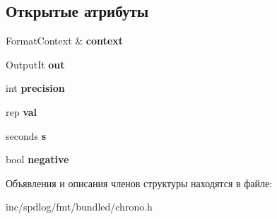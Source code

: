 \subsection*{Открытые атрибуты}
\begin{DoxyCompactItemize}
\item 
\mbox{\label{structinternal_1_1chrono__formatter_ad80a2fffd1e8491f2abdad94dab346cd}} 
Format\+Context \& {\bfseries context}
\item 
\mbox{\label{structinternal_1_1chrono__formatter_ac906e02120e826534b1266ede2e09198}} 
Output\+It {\bfseries out}
\item 
\mbox{\label{structinternal_1_1chrono__formatter_ab005c313cfaed2ea8b4b140819f59c9b}} 
int {\bfseries precision}
\item 
\mbox{\label{structinternal_1_1chrono__formatter_a397c0efe678abd21a2993bcb41019f31}} 
rep {\bfseries val}
\item 
\mbox{\label{structinternal_1_1chrono__formatter_ae3ef230affdecbe54a4d2cc48595b259}} 
seconds {\bfseries s}
\item 
\mbox{\label{structinternal_1_1chrono__formatter_a04a27f319fe9eeac0516053734fb4aeb}} 
bool {\bfseries negative}
\end{DoxyCompactItemize}


Объявления и описания членов структуры находятся в файле\+:\begin{DoxyCompactItemize}
\item 
inc/spdlog/fmt/bundled/chrono.\+h\end{DoxyCompactItemize}
